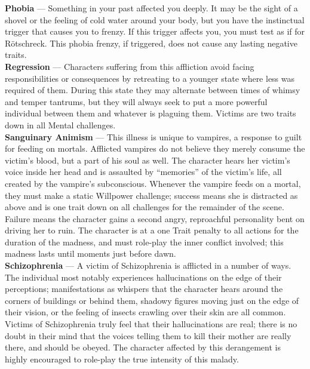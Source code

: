 \textbf{Phobia} --- Something in your past affected you deeply.  It may be the sight of a shovel or the feeling of cold water around your body, but you have the instinctual trigger that causes you to frenzy.  If this trigger affects you, you must test as if for R\"{o}tschreck.  This phobia frenzy, if triggered, does not cause any lasting negative traits. \\

\textbf{Regression} --- Characters suffering from this affliction avoid facing responsibilities or consequences by retreating to a younger state where less was required of them.  During this state they may alternate between times of whimsy and temper tantrums, but they will always seek to put a more powerful individual between them and whatever is plaguing them.  Victims are two traits down in all Mental challenges. \\

\textbf{Sanguinary Animism} --- This illness is unique to vampires, a response to guilt for feeding on mortals.  Afflicted vampires do not believe they merely consume the victim's blood, but a part of his soul as well.  The character hears her victim's voice inside her head and is assaulted by ``memories'' of the victim's life, all created by the vampire's subconscious.  Whenever the vampire feeds on a mortal, they must make a static Willpower challenge; success means she is distracted as above and is one trait down on all challenges for the remainder of the scene.  Failure means the character gains a second angry, reproachful personality bent on driving her to ruin.  The character is at a one Trait penalty to all actions for the duration of the madness, and must role-play the inner conflict involved; this madness lasts until moments just before dawn. \\

\textbf{Schizophrenia} --- A victim of Schizophrenia is afflicted in a number of ways.  The individual most notably experiences hallucinations on the edge of their perceptions; manifestations as whispers that the character hears around the corners of buildings or behind them, shadowy figures moving just on the edge of their vision, or the feeling of insects crawling over their skin are all common.  Victims of Schizophrenia truly feel that their hallucinations are real; there is no doubt in their mind that the voices telling them to kill their mother are really there, and should be obeyed.  The character affected by this derangement is highly encouraged to role-play the true intensity of this malady.